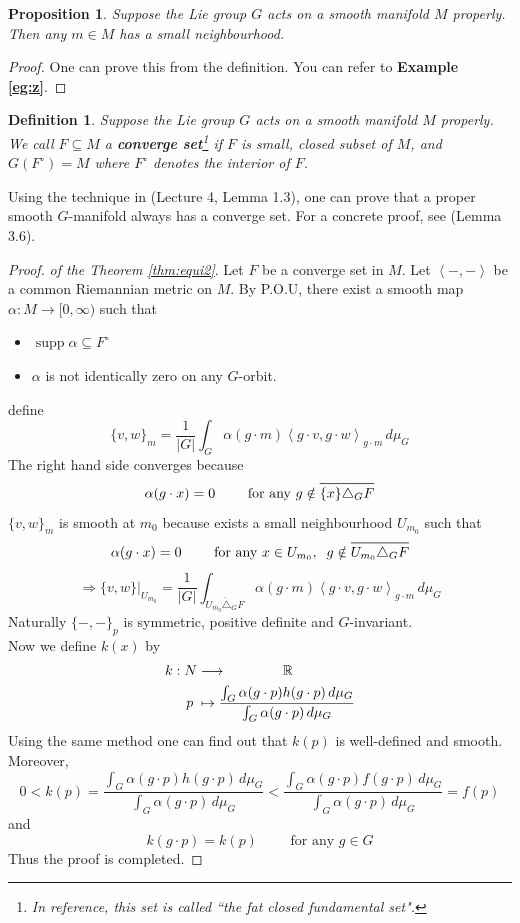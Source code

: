 \documentclass[reqno,11pt]{amsart}
\numberwithin{equation}{section}
\theoremstyle{plain}
\newtheorem{proposition}[theorem]{Proposition}
\newtheorem{defn}[theorem]{Definition}
\theoremstyle{plain}
\numberwithin{equation}{section}
\theoremstyle{remark}
\newcommand*\widebar[1]{%
	\hbox{%
		\vbox{%
			\hrule height 0.5pt %
			\kern0.6ex%
			\hbox{%
				\kern 0em%
				\ensuremath{#1}%
				\kern 0em%
			}%
		}%
	}%
}
\DeclareMathOperator{\supp}{supp}
\begin{document}
\begin{proposition}
	Suppose the Lie group $G$ acts on a smooth manifold $M$ properly. Then any $m \in M$ has a small neighbourhood.
\end{proposition}
\begin{proof}
	One can prove this from the definition. You can refer to \textbf{Example \ref{eg:z}}.
\end{proof}
\begin{defn}
	Suppose the Lie group $G$ acts on a smooth manifold $M$ properly. We call $F \subseteq M$ a \textbf{converge set}\footnote{In reference, this set is called ``the fat closed fundamental set".} if $F$ is small, closed subset of $M$, and $G (F^{\circ})=M$ where $F^{\circ}$ denotes the interior of $F$.
\end{defn}
Using the technique in \cite{ZW1}(Lecture 4, Lemma 1.3), one can prove that a proper smooth $G$-manifold always has a converge set. For a concrete proof, see \cite{RS}(Lemma 3.6).
\begin{proof}\textit{of the Theorem \ref{thm:equi2}}. Let $F$ be a converge set in $M$. Let $\left<-,-\right>$ be a common Riemannian metric on $M$. By P.O.U, there exist a smooth map $\alpha:M\rightarrow [0,\infty)$ such that
	\begin{itemize}
		\item $\supp \alpha \subseteq F^{\circ}$
		\item $\alpha$ is not identically zero on any $G$-orbit.
	\end{itemize}
define 
\begin{equation}
\{v,w\}_m=\frac{1}{|G|}\int_G \alpha(g\cdot m) \left<g \cdot v,g\cdot w\right>_{g\cdot m}\,d\mu_G
\label{eq:riemet3}
\end{equation}
The right hand side converges because
$$\alpha(g \cdot x)=0 \qquad\text{ for any } g \notin \widebar{\{x\} \triangle_GF}$$
$\{v,w\}_m$ is smooth at $m_0$ because exists a small neighbourhood $U_{m_0}$ such that 
$$\alpha(g \cdot x)=0 \qquad\text{ for any } x \in U_{m_0},\;\; g \notin \widebar{U_{m
	_0} \triangle_GF}$$
$$\Rightarrow \{v,w\}\Big|_{U_{m_0}}=\frac{1}{|G|}\int_{\overline{U_{m_0} \triangle_GF}} \alpha(g\cdot m) \left<g \cdot v,g\cdot w\right>_{g\cdot m}\,d\mu_G$$
Naturally $\{-,-\}_p$ is symmetric, positive definite and $G$-invariant.\\

Now we define $k(x)$ by 
\begin{equation}
\begin{aligned}
k:N&\longrightarrow\hspace{1.4cm} \mathbb{R}\\
p\;&\mapsto \frac{\int_G  \alpha (g \cdot p) h(g \cdot p)\,d\mu_G}{\int_G  \alpha (g \cdot p) \,d\mu_G}
\label{eq:aver3}
\end{aligned}
\end{equation}
Using the same method one can find out that $k(p)$ is well-defined and smooth. Moreover,
$$0<k(p)=\frac{\int_G  \alpha (g \cdot p) h(g \cdot p)\,d\mu_G}{\int_G  \alpha (g \cdot p) \,d\mu_G}<\frac{\int_G  \alpha (g \cdot p) f(g \cdot p)\,d\mu_G}{\int_G  \alpha (g \cdot p) \,d\mu_G}=f(p)$$
and $$k(g\cdot p)=k(p)\qquad \text{ for any }g \in G$$
Thus the proof is completed.
\end{proof}
\end{document}
